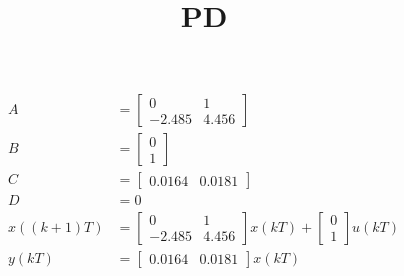 \documentclass{article}
\title{PD}
\begin{document}
\begin{align*}
    A&=\begin{bmatrix}
    0&1\\
    -2.485&4.456
    \end{bmatrix}\\
    B&=\begin{bmatrix}
        0\\1
    \end{bmatrix}\\
    C&=\begin{bmatrix}
        0.0164&0.0181
    \end{bmatrix}\\
    D&= 0\\
    x((k+1)T)&=\begin{bmatrix}
        0&1\\
        -2.485&4.456
        \end{bmatrix}x(kT)+\begin{bmatrix}
            0\\1
        \end{bmatrix}u(kT)\\
    y(kT)&=\begin{bmatrix}
        0.0164&0.0181
    \end{bmatrix}x(kT)
\end{align*}
\end{document}
